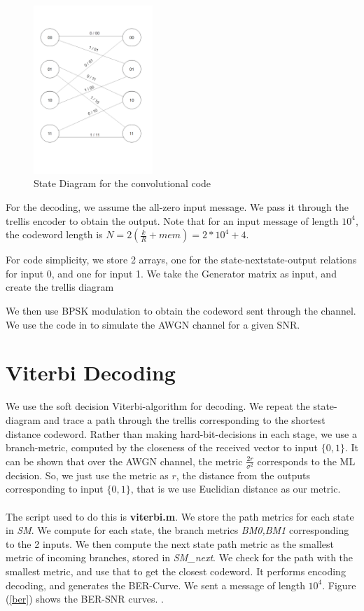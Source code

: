 \documentclass[paper=a4, fontsize=12pt]{scrartcl} %
\numberwithin{equation}{section} %
\numberwithin{figure}{section} %
\numberwithin{table}{section} %
\begin{document}
\begin{figure}
\centering
\includegraphics[width=0.4\textwidth]{images/state}
\caption{State Diagram for the convolutional code}
\label{state}
\end{figure}

For the decoding, we assume the all-zero input message. We pass it through the trellis encoder to obtain the output. Note that for an input message of length $10^4$, the codeword length is $N=2(\frac{k}{R}+mem) = 2*10^4 + 4$. 

For code simplicity, we store 2 arrays, one for the state-nextstate-output relations for input 0, and one for input 1. We take the Generator matrix as input, and create the trellis diagram

We then use BPSK modulation to obtain the codeword sent through the channel. We use the code in \cite{AWGN} to simulate the AWGN channel for a given SNR.

\section{Viterbi Decoding} 

We use the soft decision Viterbi-algorithm for decoding. We repeat the state-diagram and trace a path through the trellis corresponding to the shortest distance codeword. Rather than making hard-bit-decisions in each stage, we use a branch-metric, computed by the closeness of the received vector to input $\{0,1\}$. It can be shown that over the AWGN channel, the metric $\frac{2r}{\sigma^2}$ corresponds to the ML decision. So, we just use the metric as $r$, the distance from the outputs corresponding to input $\{0,1\}$, that is we use Euclidian distance as our metric. 
\\ \\
The script used to do this is \textbf{viterbi.m}. We store the path metrics for each state in \textit{SM}. We compute for each state, the branch metrics \textit{BM0,BM1} corresponding to the 2 inputs. We then compute the next state path metric as the smallest metric of incoming branches, stored in \textit{SM\_next}. We check for the path with the smallest metric, and use that to get the closest codeword. 
\pagebreak
It performs encoding decoding, and generates the BER-Curve. We sent a message of length $10^4$. Figure (\ref{ber}) shows the BER-SNR curves. . 
\end{document}
